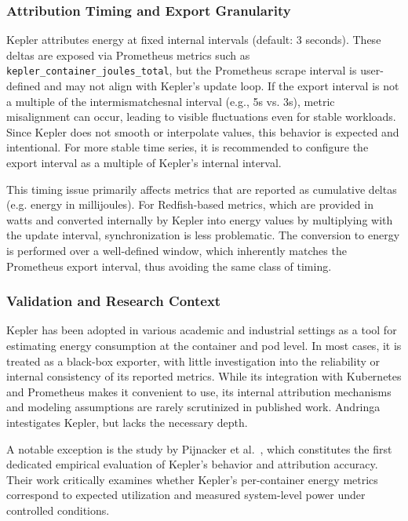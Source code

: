 \subsubsection{Attribution Timing and Export Granularity}
\label{sec:kepler-attribution-timing}

Kepler attributes energy at fixed internal intervals (default: 3 seconds). These deltas are exposed via Prometheus metrics such as \texttt{kepler\_container\_joules\_total}, but the Prometheus scrape interval is user-defined and may not align with Kepler's update loop. If the export interval is not a multiple of the intermismatchesnal interval (e.g., 5s vs. 3s), metric misalignment can occur, leading to visible fluctuations even for stable workloads. Since Kepler does not smooth or interpolate values, this behavior is expected and intentional. For more stable time series, it is recommended to configure the export interval as a multiple of Kepler’s internal interval.

This timing issue primarily affects metrics that are reported as cumulative deltas (e.g. energy in millijoules). For Redfish-based metrics, which are provided in watts and converted internally by Kepler into energy values by multiplying with the update interval, synchronization is less problematic. The conversion to energy is performed over a well-defined window, which inherently matches the Prometheus export interval, thus avoiding the same class of timing.

\subsubsection{Validation and Research Context}

Kepler has been adopted in various academic and industrial settings as a tool for estimating energy consumption at the container and pod level. In most cases, it is treated as a black-box exporter, with little investigation into the reliability or internal consistency of its reported metrics. While its integration with Kubernetes and Prometheus makes it convenient to use, its internal attribution mechanisms and modeling assumptions are rarely scrutinized in published work. Andringa\parencite{andringa2024estimating} intestigates Kepler, but lacks the necessary depth.

A notable exception is the study by Pijnacker et al.~\parencite{pijnackerEstimatingContainerlevelPower2024,pijnackerContainerlevelEnergyObservability2025}, which constitutes the first dedicated empirical evaluation of Kepler’s behavior and attribution accuracy. Their work critically examines whether Kepler’s per-container energy metrics correspond to expected utilization and measured system-level power under controlled conditions.

